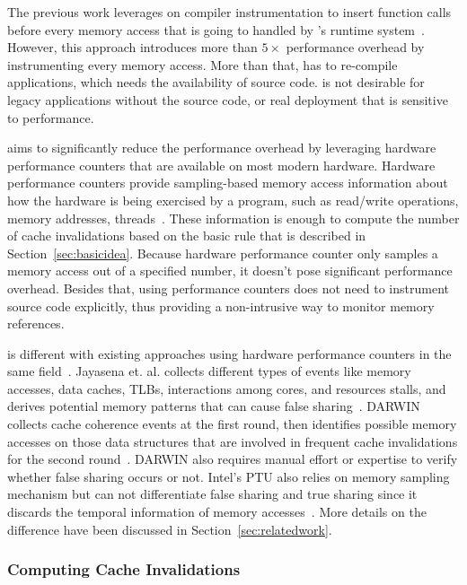 The previous work \Predator{} leverages on compiler instrumentation to insert function calls before every memory access that is going to handled by \Predator{}'s runtime system~\cite{Predator}. However, this approach introduces more than $5\times$ performance overhead by instrumenting every memory access. More than that, \Predator{} has to re-compile applications, which needs the availability of source code. \Predator{} is not desirable for legacy applications without the source code, or real deployment that is sensitive to performance. 

\cheetah{} aims to significantly reduce the performance overhead by leveraging hardware performance counters that are available on most modern hardware. Hardware performance counters provide sampling-based memory access information about how the hardware is being exercised by a program, such as read/write operations, memory addresses, threads~\cite{Mucci99papi}. These information is enough to compute the number of cache invalidations based on the basic rule that is described in Section~\ref{sec:basicidea}. Because hardware performance counter only samples a memory access out of a specified number, it doesn't pose significant performance overhead. 
Besides that, using performance counters does not need to instrument source code explicitly, thus providing a non-intrusive way to monitor memory references. 

\cheetah{} is different with existing approaches using hardware performance counters in the same field~\cite{mldetect, openmp, detect:ptu}. Jayasena et. al. collects different types of events like memory accesses, data caches, TLBs, interactions among cores, and resources stalls, and derives potential memory patterns that can cause false sharing~\cite{mldetect}. DARWIN collects cache coherence events at the first round, then identifies possible memory accesses on those data structures that are involved in frequent cache invalidations for the second round~\cite{openmp}. DARWIN also requires manual effort or expertise to verify whether false sharing occurs or not.  Intel's PTU also relies on memory sampling mechanism but can not differentiate false sharing and true sharing since it discards the temporal information of memory accesses~\cite{detect:ptu}. More details on the difference have been discussed in Section~\ref{sec:relatedwork}.



\subsubsection{Computing Cache Invalidations}
\label{sec:computeinvalidations}

